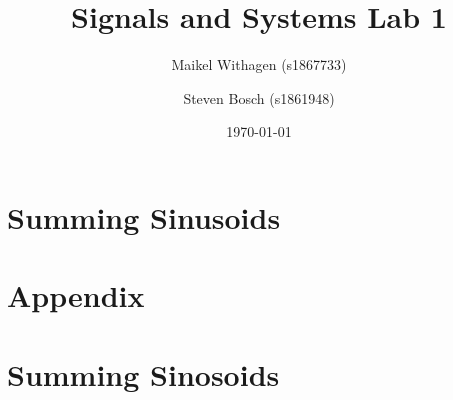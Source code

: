 \documentclass[10pt]{article}
\title{Signals and Systems Lab 1}
\author{Maikel Withagen (s1867733) \and Steven Bosch (s1861948)}
\date{\today}
\begin{document}
\maketitle

\section{Summing Sinusoids}
\subsection{}


\newpage
\section*{Appendix}
\appendix
\section{Summing Sinosoids}
\end{document}
